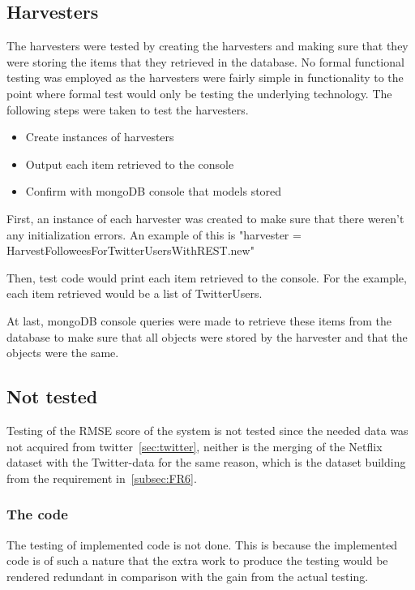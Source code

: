 \subsection{Harvesters}
The harvesters were tested by creating the harvesters and making sure that they were storing the items that they retrieved in the database. No formal functional testing was employed as the harvesters were fairly simple in functionality to the point where formal test would only be testing the underlying technology. The following steps were taken to test the harvesters.

	\begin{itemize}
	\item Create instances of harvesters
	\item Output each item retrieved to the console
	\item Confirm with mongoDB console that models stored
	\end{itemize}

First, an instance of each harvester was created to make sure that there weren't any initialization errors. An example of this is "harvester = HarvestFolloweesForTwitterUsersWithREST.new"

Then, test code would print each item retrieved to the console. For the example, each item retrieved would be a list of TwitterUsers.

At last, mongoDB console queries were made to retrieve these items from the database to make sure that all objects were stored by the harvester and that the objects were the same.

\subsection{Not tested}
Testing of the RMSE score of the system is not tested since the needed data was not acquired from twitter~\ref{sec:twitter}, neither is the merging of the Netflix dataset with the Twitter-data for the same reason, which is the dataset building from the requirement in~\ref{subsec:FR6}.

\subsubsection{The code}
The testing of implemented code is not done. This is because the implemented code is of such a nature that the extra work to produce the testing would be rendered redundant in comparison with the gain from the actual testing.
